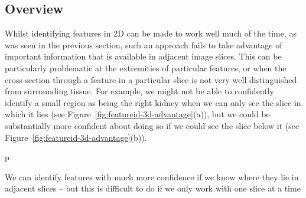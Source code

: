 \vspace{-.7\baselineskip}

\subsection{Overview}

\vspace{-.3\baselineskip}

Whilst identifying features in 2D can be made to work well much of the time, as was seen in the previous section, such an approach fails to take advantage of important information that is available in adjacent image slices. This can be particularly problematic at the extremities of particular features, or when the cross-section through a feature in a particular slice is not very well distinguished from surrounding tissue. For example, we might not be able to confidently identify a small region as being the right kidney when we can only see the slice in which it lies (see Figure~\ref{fig:featureid-3d-advantage}(a)), but we could be substantially more confident about doing so if we could see the slice below it (see Figure~\ref{fig:featureid-3d-advantage}(b)).

\begin{stusubfig}{p}
	\hspace{4mm}%
\caption{We can identify features with much more confidence if we know where they lie in adjacent slices -- but this is difficult to do if we only work with one slice at a time}
\label{fig:featureid-3d-advantage}
\end{stusubfig}

